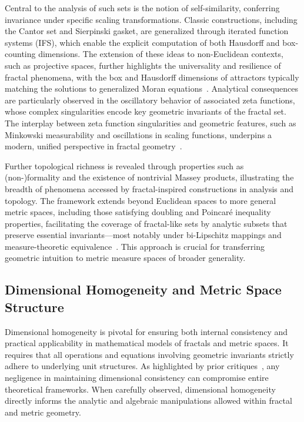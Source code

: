 \documentclass[sigconf]{acmart}
\begin{document}
Central to the analysis of such sets is the notion of self-similarity, conferring invariance under specific scaling transformations. Classic constructions, including the Cantor set and Sierpinski gasket, are generalized through iterated function systems (IFS), which enable the explicit computation of both Hausdorff and box-counting dimensions. The extension of these ideas to non-Euclidean contexts, such as projective spaces, further highlights the universality and resilience of fractal phenomena, with the box and Hausdorff dimensions of attractors typically matching the solutions to generalized Moran equations~\cite{ref24,ref33}. Analytical consequences are particularly observed in the oscillatory behavior of associated zeta functions, whose complex singularities encode key geometric invariants of the fractal set. The interplay between zeta function singularities and geometric features, such as Minkowski measurability and oscillations in scaling functions, underpins a modern, unified perspective in fractal geometry~\cite{ref21,ref23,ref33}.

Further topological richness is revealed through properties such as (non-)formality and the existence of nontrivial Massey products, illustrating the breadth of phenomena accessed by fractal-inspired constructions in analysis and topology. The framework extends beyond Euclidean spaces to more general metric spaces, including those satisfying doubling and Poincaré inequality properties, facilitating the coverage of fractal-like sets by analytic subsets that preserve essential invariants—most notably under bi-Lipschitz mappings and measure-theoretic equivalence~\cite{ref23,ref93,ref6}. This approach is crucial for transferring geometric intuition to metric measure spaces of broader generality.

\subsection{Dimensional Homogeneity and Metric Space Structure}

Dimensional homogeneity is pivotal for ensuring both internal consistency and practical applicability in mathematical models of fractals and metric spaces. It requires that all operations and equations involving geometric invariants strictly adhere to underlying unit structures. As highlighted by prior critiques~\cite{ref61}, any negligence in maintaining dimensional consistency can compromise entire theoretical frameworks. When carefully observed, dimensional homogeneity directly informs the analytic and algebraic manipulations allowed within fractal and metric geometry.
\end{document}
